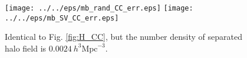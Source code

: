 \begin{figure}[tbp]
\begin{center}
\texttt{[image: ../../eps/mb\_rand\_CC\_err.eps]}
\texttt{[image: ../../eps/mb\_SV\_CC\_err.eps]}
\end{center}
\vspace{-0.7cm}
\caption{Identical to Fig. \ref{fig:H_CC}, but the number density of separated
halo field is $0.0024\ h^{3}\mathrm{Mpc}^{-3}$.}
\label{fig:H_C_24}
\end{figure}
